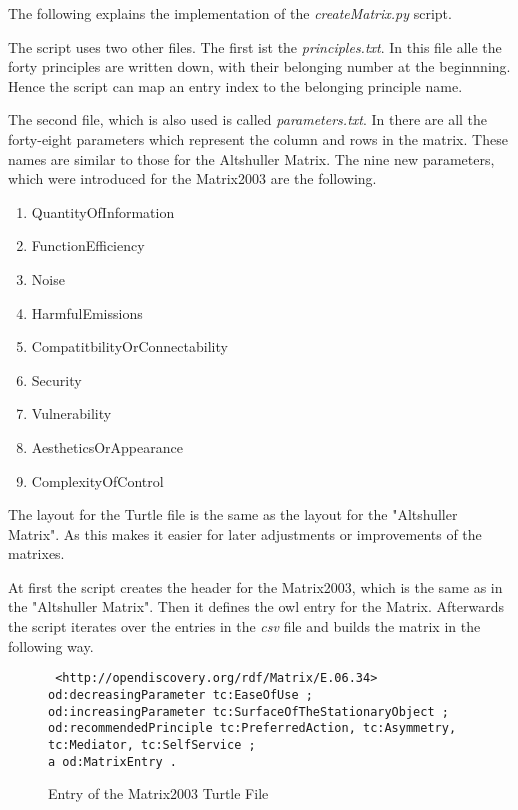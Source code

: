 The following explains the implementation of the \textit{createMatrix.py} script.

The script uses two other files. 
The first ist the \textit{principles.txt}.
In this file alle the forty principles are written down, with their belonging number at the beginnning.
Hence the script can map an entry index to the belonging principle name.

The second file, which is also used is called \textit{parameters.txt}.
In there are all the forty-eight parameters which represent the column and rows in the matrix.
These names are similar to those for the Altshuller Matrix.
The nine new parameters, which were introduced for the Matrix2003 are the following. 

\begin{enumerate}[noitemsep]
    \item QuantityOfInformation
    \item FunctionEfficiency
    \item Noise
    \item HarmfulEmissions
    \item CompatitbilityOrConnectability
    \item Security
    \item Vulnerability
    \item AestheticsOrAppearance
    \item ComplexityOfControl
\end{enumerate}

The layout for the Turtle file is the same as the layout for the "Altshuller Matrix". 
As this makes it easier for later adjustments or improvements of the matrixes.

At first the script creates the header for the Matrix2003, which is the same as in the "Altshuller Matrix".
Then it defines the owl entry for the Matrix.
Afterwards the script iterates over the entries in the \textit{csv} file and builds the matrix in the following way.

\begin{figure}[H]
    \centering
    \begin{code}\tt
        <http://opendiscovery.org/rdf/Matrix/E.06.34>\\
        \> od:decreasingParameter tc:EaseOfUse ;\\
        \> od:increasingParameter tc:SurfaceOfTheStationaryObject ;\\
        \> od:recommendedPrinciple tc:PreferredAction, tc:Asymmetry, \\
        \> \> \> tc:Mediator, tc:SelfService ;\\
        \> a od:MatrixEntry .
    \end{code}
    \caption{Entry of the Matrix2003 Turtle File}
\end{figure}

